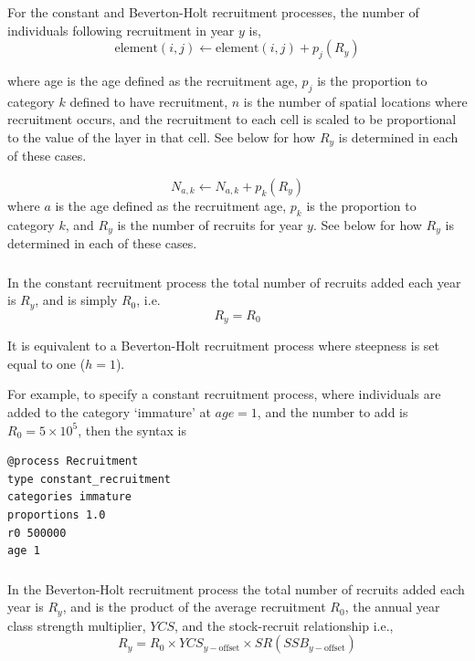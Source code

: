 For the constant and Beverton-Holt recruitment processes, the  number of individuals following recruitment in year $y$ is,  
\begin{equation}
  \text{element}(i,j) \leftarrow \text{element}(i,j) + p_j(R_y)
\end{equation}

where age is the age defined as the recruitment age, $p_j$ is the proportion to category $k$ defined to have recruitment, $n$ is the number of spatial locations where recruitment occurs, and the recruitment to each cell is scaled to be proportional to the value of the layer in that cell. See below for how $R_y$ is determined in each of these cases.

\begin{equation}
N_{a,k} \leftarrow N_{a,k} + p_k(R_y)
\end{equation}
where $a$ is the age defined as the recruitment age, $p_k$ is the proportion to category $k$, and $R_y$ is the number of recruits for year $y$. See below for how $R_y$ is determined in each of these cases.
\subsubsection*{}
\CH
In the constant recruitment process the total number of recruits added each year is $R_y$, and is simply $R_0$, i.e.
\begin{equation}
  R_y = R_0
\end{equation}

It is equivalent to a Beverton-Holt recruitment process where steepness is set equal to one ($h=1$).

For example, to specify a constant recruitment process, where individuals are added to the category `immature' at $age=1$, and the number to add is $R_0=5 \times 10^5$, then the syntax is

{\small{\begin{verbatim}
@process Recruitment
type constant_recruitment
categories immature
proportions 1.0
r0 500000
age 1
\end{verbatim}}}

\subsubsection*{}
\CH
In the Beverton-Holt recruitment process the total number of recruits added each year is $R_y$, and is the product of the average recruitment $R_0$, the annual year class strength multiplier, $YCS$, and the stock-recruit relationship i.e.,
\begin{equation}
  R_y = R_0 \times YCS_{y-\text{offset}} \times SR(SSB_{y-\text{offset}})
\end{equation}
  
